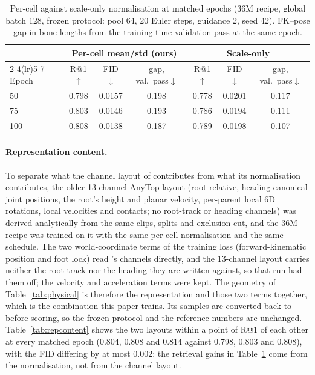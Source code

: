\begin{table}[h]
\centering\footnotesize
\caption{Per-cell against scale-only normalisation at matched epochs (\num{36}M recipe, global batch
128, frozen protocol: pool 64, 20 Euler steps, guidance 2, seed 42). FK--pose gap in bone lengths from
the training-time validation pass at the same epoch.}\label{tab:rep}
\begin{tabular}{lcccccc}
\toprule
& \multicolumn{3}{c}{Per-cell mean/std (ours)} & \multicolumn{3}{c}{Scale-only} \\
\cmidrule(lr){2-4}\cmidrule(lr){5-7}
Epoch & R@1$\uparrow$ & FID$\downarrow$ & gap, val.\ pass$\downarrow$ & R@1$\uparrow$ & FID$\downarrow$ & gap, val.\ pass$\downarrow$ \\
\midrule
50  & \num{0.798} & \num{0.0157} & \num{0.198} & \num{0.778} & \num{0.0201} & \num{0.117} \\
75  & \num{0.803} & \num{0.0146} & \num{0.193} & \num{0.786} & \num{0.0194} & \num{0.111} \\
100 & \num{0.808} & \num{0.0138} & \num{0.187} & \num{0.789} & \num{0.0198} & \num{0.107} \\
\bottomrule
\end{tabular}
\end{table}

\paragraph{Representation content.} To separate what the channel layout of \rep{} contributes from
what its normalisation contributes, the older 13-channel AnyTop layout (root-relative, heading-canonical
joint positions, the root's height and planar velocity, per-parent local 6D rotations, local velocities
and contacts; no root-track or heading channels) was derived analytically from the same clips, splits
and exclusion cut, and the \num{36}M recipe was trained on it with the same per-cell normalisation and
the same schedule. The two world-coordinate terms of the training loss (forward-kinematic position and
foot lock) read \rep{}'s channels directly, and the 13-channel layout carries neither the root track nor the
heading they are written against, so that run had them off; the velocity and acceleration terms were kept.
The geometry of Table~\ref{tab:physical} is therefore the representation and those two terms together, which is
the combination this paper trains. Its samples are converted back
to \rep{} before scoring, so the frozen protocol and the reference numbers are unchanged.
Table~\ref{tab:repcontent} shows the two layouts within a point of R@1 of each other at every matched
epoch (\num{0.804}, \num{0.808} and \num{0.814} against \num{0.798}, \num{0.803} and \num{0.808}),
with the FID differing by at most \num{0.002}: the retrieval gains in Table~\ref{tab:rep} come from the
normalisation, not from the channel layout.


